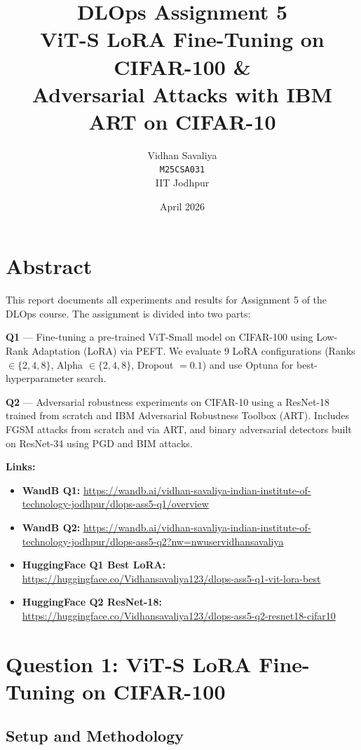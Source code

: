 \documentclass[11pt,a4paper]{article}
\title{\textbf{DLOps Assignment 5}\\[6pt]
       \large ViT-S LoRA Fine-Tuning on CIFAR-100 \&\\
       Adversarial Attacks with IBM ART on CIFAR-10}
\author{Vidhan Savaliya \\ \texttt{M25CSA031} \\ IIT Jodhpur}
\date{April 2026}
\begin{document}
\maketitle
\tableofcontents
\newpage

\section*{Abstract}
This report documents all experiments and results for Assignment 5 of the DLOps course. The assignment is divided into two parts:

\textbf{Q1} — Fine-tuning a pre-trained ViT-Small model on CIFAR-100 using Low-Rank Adaptation (LoRA) via PEFT. We evaluate 9 LoRA configurations (Ranks $\in \{2,4,8\}$, Alpha $\in \{2,4,8\}$, Dropout $= 0.1$) and use Optuna for best-hyperparameter search.

\textbf{Q2} — Adversarial robustness experiments on CIFAR-10 using a ResNet-18 trained from scratch and IBM Adversarial Robustness Toolbox (ART). Includes FGSM attacks from scratch and via ART, and binary adversarial detectors built on ResNet-34 using PGD and BIM attacks.

\bigskip
\noindent\textbf{Links:}
\begin{itemize}
  \item \textbf{WandB Q1:} \url{https://wandb.ai/vidhan-savaliya-indian-institute-of-technology-jodhpur/dlops-ass5-q1/overview}
  \item \textbf{WandB Q2:} \url{https://wandb.ai/vidhan-savaliya-indian-institute-of-technology-jodhpur/dlops-ass5-q2?nw=nwuservidhansavaliya}
  \item \textbf{HuggingFace Q1 Best LoRA:} \url{https://huggingface.co/Vidhansavaliya123/dlops-ass5-q1-vit-lora-best}
  \item \textbf{HuggingFace Q2 ResNet-18:} \url{https://huggingface.co/Vidhansavaliya123/dlops-ass5-q2-resnet18-cifar10}
\end{itemize}

\newpage

\section{Question 1: ViT-S LoRA Fine-Tuning on CIFAR-100}

\subsection{Setup and Methodology}
\end{document}
